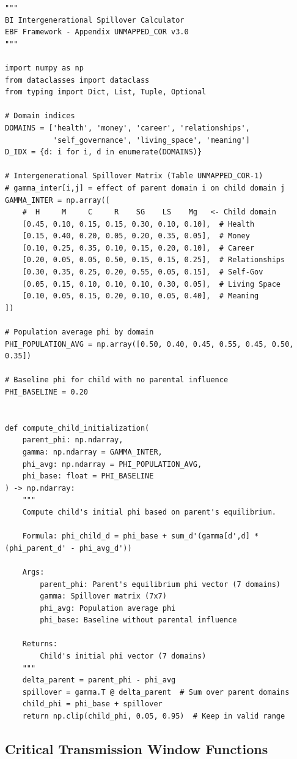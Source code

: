 \begin{verbatim}
"""
BI Intergenerational Spillover Calculator
EBF Framework - Appendix UNMAPPED_COR v3.0
"""

import numpy as np
from dataclasses import dataclass
from typing import Dict, List, Tuple, Optional

# Domain indices
DOMAINS = ['health', 'money', 'career', 'relationships',
           'self_governance', 'living_space', 'meaning']
D_IDX = {d: i for i, d in enumerate(DOMAINS)}

# Intergenerational Spillover Matrix (Table UNMAPPED_COR-1)
# gamma_inter[i,j] = effect of parent domain i on child domain j
GAMMA_INTER = np.array([
    #  H     M     C     R    SG    LS    Mg   <- Child domain
    [0.45, 0.10, 0.15, 0.15, 0.30, 0.10, 0.10],  # Health
    [0.15, 0.40, 0.20, 0.05, 0.20, 0.35, 0.05],  # Money
    [0.10, 0.25, 0.35, 0.10, 0.15, 0.20, 0.10],  # Career
    [0.20, 0.05, 0.05, 0.50, 0.15, 0.15, 0.25],  # Relationships
    [0.30, 0.35, 0.25, 0.20, 0.55, 0.05, 0.15],  # Self-Gov
    [0.05, 0.15, 0.10, 0.10, 0.10, 0.30, 0.05],  # Living Space
    [0.10, 0.05, 0.15, 0.20, 0.10, 0.05, 0.40],  # Meaning
])

# Population average phi by domain
PHI_POPULATION_AVG = np.array([0.50, 0.40, 0.45, 0.55, 0.45, 0.50, 0.35])

# Baseline phi for child with no parental influence
PHI_BASELINE = 0.20


def compute_child_initialization(
    parent_phi: np.ndarray,
    gamma: np.ndarray = GAMMA_INTER,
    phi_avg: np.ndarray = PHI_POPULATION_AVG,
    phi_base: float = PHI_BASELINE
) -> np.ndarray:
    """
    Compute child's initial phi based on parent's equilibrium.

    Formula: phi_child_d = phi_base + sum_d'(gamma[d',d] * (phi_parent_d' - phi_avg_d'))

    Args:
        parent_phi: Parent's equilibrium phi vector (7 domains)
        gamma: Spillover matrix (7x7)
        phi_avg: Population average phi
        phi_base: Baseline without parental influence

    Returns:
        Child's initial phi vector (7 domains)
    """
    delta_parent = parent_phi - phi_avg
    spillover = gamma.T @ delta_parent  # Sum over parent domains
    child_phi = phi_base + spillover
    return np.clip(child_phi, 0.05, 0.95)  # Keep in valid range
\end{verbatim}

\subsection{Critical Transmission Window Functions}

